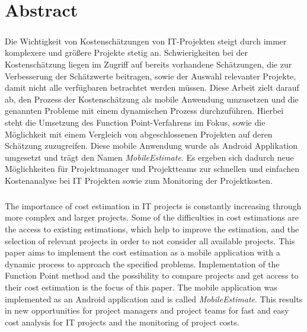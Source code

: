 

\chapter*{Abstract}

\paragraph*{}
Die Wichtigkeit von Kostenschätzungen von IT-Projekten steigt durch immer komplexere und größere Projekte stetig an. Schwierigkeiten bei der Kostenschätzung liegen im Zugriff auf bereits vorhandene Schätzungen, die zur Verbesserung der Schätzwerte beitragen, sowie der Auswahl relevanter Projekte, damit nicht alle verfügbaren betrachtet werden müssen. Diese Arbeit zielt darauf ab, den Prozess der Kostenschätzung als mobile Anwendung umzusetzen und die genannten Probleme mit einem dynamischen Prozess durchzuführen. Hierbei steht die Umsetzung des Function Point-Verfahrens im Fokus, sowie die Möglichkeit mit einem Vergleich von abgeschlossenen Projekten auf deren Schätzung zuzugreifen. Diese mobile Anwendung wurde als Android Applikation umgesetzt und trägt den Namen \textit{MobileEstimate}. Es ergeben sich dadurch neue Möglichkeiten für Projektmanager und Projektteams zur schnellen und einfachen Kostenanalyse bei IT Projekten sowie zum Monitoring der Projektkosten.

\paragraph*{}
The importance of cost estimation in IT projects is constantly increasing through more complex and larger projects. Some of the difficulties in cost estimations are the access to existing estimations, which help to improve the estimation, and the selection of relevant projects in order to not consider all available projects. This paper aims to implement the cost estimation as a mobile application with a dynamic process to approach the specified problems. Implementation of the Function Point method and the possibility to compare projects and get access to their cost estimation is the focus of this paper. The mobile application was implemented as an Android application and is called \textit{MobileEstimate}. This results in new opportunities for project managers and project teams for fast and easy cost analysis for IT projects and the monitoring of project costs.

